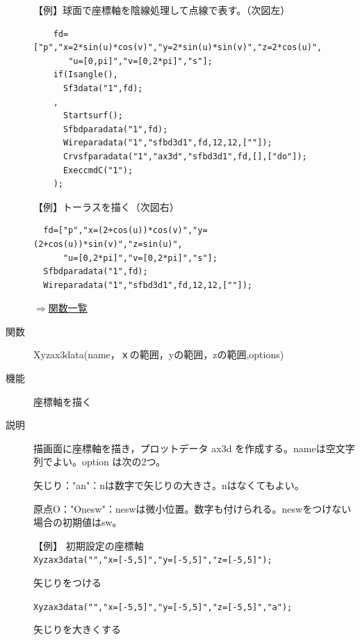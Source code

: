 \documentclass[papersize,a4paper,12pt,uplatex]{jsarticle}
\begin{document}
\begin{description}

\vspace{\baselineskip}
【例】球面で座標軸を陰線処理して点線で表す。（次図左）
\begin{verbatim}
    fd=["p","x=2*sin(u)*cos(v)","y=2*sin(u)*sin(v)","z=2*cos(u)",
       "u=[0,pi]","v=[0,2*pi]","s"];
    if(Isangle(),
      Sf3data("1",fd);
    ,
      Startsurf();
      Sfbdparadata("1",fd);
      Wireparadata("1","sfbd3d1",fd,12,12,[""]);
      Crvsfparadata("1","ax3d","sfbd3d1",fd,[],["do"]);
      ExeccmdC("1");
    );
\end{verbatim}
【例】トーラスを描く（次図右）
\begin{verbatim}
  fd=["p","x=(2+cos(u))*cos(v)","y=(2+cos(u))*sin(v)","z=sin(u)",
      "u=[0,2*pi]","v=[0,2*pi]","s"];
  Sfbdparadata("1",fd);
  Wireparadata("1","sfbd3d1",fd,12,12,[""]); 
\end{verbatim}
\vspace{\baselineskip}
    \begin{center}     \end{center}

\begin{flushright} \hyperlink{functionlist}{$\Rightarrow$関数一覧}\end{flushright}
\vspace{\baselineskip}
\hypertarget{xyzax3data}{}
\item[関数]  Xyzax3data(name，ｘの範囲，yの範囲，zの範囲,options)
\item[機能]  座標軸を描く
\item[説明]  描画面に座標軸を描き，プロットデータ ax3d  を作成する。nameは空文字列でよい。option は次の2つ。

矢じり："an"：nは数字で矢じりの大きさ。nはなくてもよい。

原点O："Onesw"：neswは微小位置。数字も付けられる。neswをつけない場合の初期値はsw。

【例】 初期設定の座標軸\\
\verb|Xyzax3data("","x=[-5,5]","y=[-5,5]","z=[-5,5]");|
        
 矢じりをつける
 
 \verb|Xyzax3data("","x=[-5,5]","y=[-5,5]","z=[-5,5]","a");|
 
 矢じりを大きくする
 

\end{description}
\end{document}
